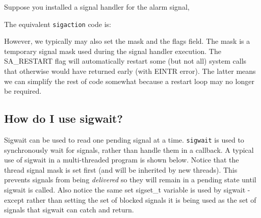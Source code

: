 Suppose you installed a signal handler for the alarm signal,

\begin{Shaded}
\begin{Highlighting}[]
\end{Highlighting}
\end{Shaded}

The equivalent \texttt{sigaction} code is:

\begin{Shaded}
\begin{Highlighting}[]
 
\NormalTok{; }
\end{Highlighting}
\end{Shaded}

However, we typically may also set the mask and the flags field. The
mask is a temporary signal mask used during the signal handler
execution. The SA\_RESTART flag will automatically restart some (but not
all) system calls that otherwise would have returned early (with EINTR
error). The latter means we can simplify the rest of code somewhat
because a restart loop may no longer be required.

\begin{Shaded}
\begin{Highlighting}[]
\end{Highlighting}
\end{Shaded}

\subsection{How do I use sigwait?}\label{how-do-i-use-sigwait}

Sigwait can be used to read one pending signal at a time.
\texttt{sigwait} is used to synchronously wait for signals, rather than
handle them in a callback. A typical use of sigwait in a multi-threaded
program is shown below. Notice that the thread signal mask is set first
(and will be inherited by new threads). This prevents signals from being
\emph{delivered} so they will remain in a pending state until sigwait is
called. Also notice the same set sigset\_t variable is used by sigwait -
except rather than setting the set of blocked signals it is being used
as the set of signals that sigwait can catch and return.

